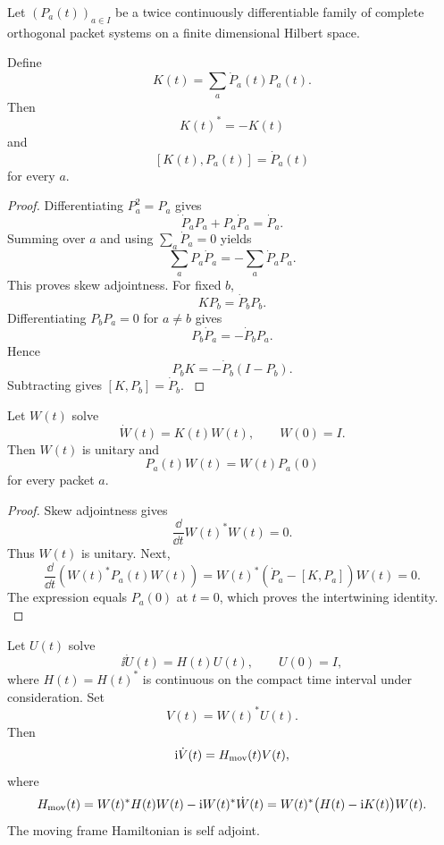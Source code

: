 Let \((P_a(t))_{a\in I}\) be a twice continuously differentiable family of complete orthogonal packet systems on a finite dimensional Hilbert space.

\begin{theorem}\label{strong:theorem:012}\label{strong:thm:kato_connection}
Define
\[
K(t)
=
\sum_a\dot P_a(t)P_a(t).
\]
Then
\[
K(t)^*=-K(t)
\]
and
\[
[K(t),P_a(t)]=\dot P_a(t)
\]
for every \(a\).
\end{theorem}

\begin{proof}\label{strong:proof:021}
Differentiating \(P_a^2=P_a\) gives
\[
\dot P_aP_a+P_a\dot P_a=\dot P_a.
\]
Summing over \(a\) and using \(\sum_a\dot P_a=0\) yields
\[
\sum_aP_a\dot P_a=-\sum_a\dot P_aP_a.
\]
This proves skew adjointness. For fixed \(b\),
\[
KP_b=\dot P_bP_b.
\]
Differentiating \(P_bP_a=0\) for \(a\neq b\) gives
\[
P_b\dot P_a=-\dot P_bP_a.
\]
Hence
\[
P_bK=-\dot P_b(I-P_b).
\]
Subtracting gives \([K,P_b]=\dot P_b\).
\label{strong:proof:021:end}\end{proof}

\begin{theorem}\label{strong:theorem:013}\label{strong:thm:kato_transport}
Let \(W(t)\) solve
\[
\dot W(t)=K(t)W(t),
\qquad
W(0)=I.
\]
Then \(W(t)\) is unitary and
\[
P_a(t)W(t)=W(t)P_a(0)
\]
for every packet \(a\).
\end{theorem}

\begin{proof}\label{strong:proof:022}
Skew adjointness gives
\[
\frac{\dd}{\dd t}W(t)^*W(t)=0.
\]
Thus \(W(t)\) is unitary. Next,
\[
\frac{\dd}{\dd t}
\left(W(t)^*P_a(t)W(t)\right)
=
W(t)^*
\left(
\dot P_a-[K,P_a]
\right)
W(t)=0.
\]
The expression equals \(P_a(0)\) at \(t=0\), which proves the intertwining identity.
\label{strong:proof:022:end}\end{proof}

\begin{theorem}\label{strong:theorem:014}\label{strong:thm:moving_frame}
Let \(U(t)\) solve
\[
\ii\dot U(t)=H(t)U(t),
\qquad
U(0)=I,
\]
where \(H(t)=H(t)^*\) is continuous on the compact time interval under consideration. Set
\[
V(t)=W(t)^*U(t).
\]
Then
\[
\mathrm i\dot V(t)=H_{\rm mov}(t)V(t),
\]
where
\[
H_{\rm mov}(t)
=
W(t)^*H(t)W(t)-\mathrm i W(t)^*\dot W(t)
=
W(t)^*\bigl(H(t)-\mathrm i K(t)\bigr)W(t).
\]
The moving frame Hamiltonian is self adjoint.
\end{theorem}

